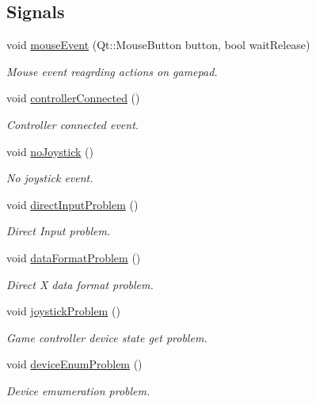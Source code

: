 \subsection*{Signals}
\begin{DoxyCompactItemize}
\item 
void \hyperlink{class_peripheral_controller_a3d3823d5a0d7ee0c8177af2680bd6b20}{mouse\-Event} (Qt\-::\-Mouse\-Button button, bool wait\-Release)
\begin{DoxyCompactList}\small\item\em Mouse event reagrding actions on gamepad. \end{DoxyCompactList}\item 
void \hyperlink{class_peripheral_controller_a3d137d0d682fdff57874d84dd30d1402}{controller\-Connected} ()
\begin{DoxyCompactList}\small\item\em Controller connected event. \end{DoxyCompactList}\item 
void \hyperlink{class_peripheral_controller_ad02bcbe44c33e4604a8fdc7408e95eb3}{no\-Joystick} ()
\begin{DoxyCompactList}\small\item\em No joystick event. \end{DoxyCompactList}\item 
void \hyperlink{class_peripheral_controller_a18bfa7068e897f4387996c8965560a16}{direct\-Input\-Problem} ()
\begin{DoxyCompactList}\small\item\em Direct Input problem. \end{DoxyCompactList}\item 
void \hyperlink{class_peripheral_controller_a89e97bf7e6a3f549a3071cce03d30023}{data\-Format\-Problem} ()
\begin{DoxyCompactList}\small\item\em Direct X data format problem. \end{DoxyCompactList}\item 
void \hyperlink{class_peripheral_controller_afcb9cd91ec05f215875678e157dd8f6a}{joystick\-Problem} ()
\begin{DoxyCompactList}\small\item\em Game controller device state get problem. \end{DoxyCompactList}\item 
void \hyperlink{class_peripheral_controller_a92c4f3c1723444e89ebd0b847a199c90}{device\-Enum\-Problem} ()
\begin{DoxyCompactList}\small\item\em Device emumeration problem. \end{DoxyCompactList}\item 

\end{DoxyCompactItemize}
